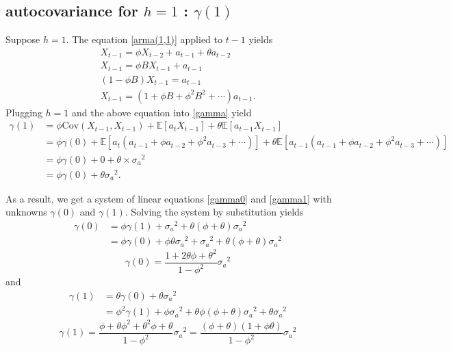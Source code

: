 \documentclass{article}
\newcommand\cov{\ensuremath{\text{Cov}}}
\newcommand\sa{\ensuremath{{\sigma_a}^2}}
\begin{document}
%
\subsection{autocovariance for \(h=1\) : \(\gamma(1)\)}\label{h1}
Suppose \(h=1\).
The equation \eqref{arma(1,1)} applied to \(t-1\) yields
\begin{gather*}
X_{t-1}=\phi X_{t-2}+a_{t-1}+\theta a_{t-2}\\
X_{t-1}=\phi BX_{t-1}+a_{t-1}\\
(1-\phi B)X_{t-1}=a_{t-1}\\
X_{t-1}=(1+\phi B+\phi^2B^2+\cdots)a_{t-1}.
\end{gather*}
Plugging \(h=1\) and the above equation into \eqref{gamma} yield
\begin{equation}\label{gamma1}
\begin{aligned}
\gamma(1)
&=\phi\cov(X_{t-1},X_{t-1})+\mathbb E[a_tX_{t-1}]+\theta\mathbb E[a_{t-1}X_{t-1}]\\
&=\phi\gamma(0)+\mathbb E[a_t(a_{t-1}+\phi a_{t-2}+\phi^2a_{t-3}+\cdots)]+\theta\mathbb E[a_{t-1}(a_{t-1}+\phi a_{t-2}+\phi^2a_{t-3}+\cdots)]\\
&=\phi\gamma(0)+0+\theta\times{\sigma_a}^2\\
&=\phi\gamma(0)+\theta{\sigma_a}^2.
\end{aligned}
\end{equation}

As a result, we get a system of linear equations \eqref{gamma0} and \eqref{gamma1} with unknowns \(\gamma(0)\) and \(\gamma(1)\).
Solving the system by substitution yields
\begin{align*}
\gamma(0)
&=\phi\gamma(1)+\sa+\theta(\phi+\theta)\sa\\
&=\phi\gamma(0)+\phi\theta\sa+\sa+\theta(\phi+\theta)\sa
\end{align*}
\begin{equation}\label{h0_}
\gamma(0)=\frac{1+2\theta\phi+\theta^2}{1-\phi^2}\sa
\end{equation}
and
\begin{align*}
\gamma(1)
&=\theta\gamma(0)+\theta\sa\\
&=\phi^2\gamma(1)+\phi\sa+\theta\phi(\phi+\theta)\sa+\theta\sa
\end{align*}
\begin{equation}\label{h1_}
\gamma(1)=\frac{\phi+\theta\phi^2+\theta^2\phi+\theta}{1-\phi^2}\sa=\frac{(\phi+\theta)(1+\phi\theta)}{1-\phi^2}\sa
\end{equation}
\end{document}
